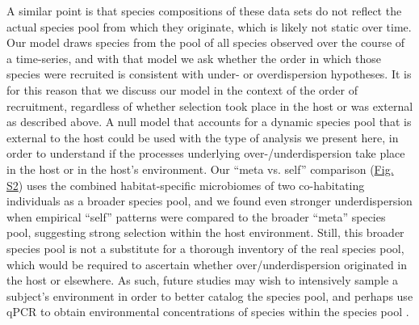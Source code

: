 \documentclass{article}
\begin{document}
\par
A similar point is that species compositions of these data sets do not reflect the actual species pool from which they originate, which is likely not static over time. Our model draws species from the pool of all species observed over the course of a time-series, and with that model we ask whether the order in which those species were recruited is consistent with under- or overdispersion hypotheses. It is for this reason that we discuss our model in the context of the order of recruitment, regardless of whether selection took place in the host or was external as described above. A null model that accounts for a dynamic species pool that is external to the host could be used with the type of analysis we present here, in order to understand if the processes underlying over-/underdispersion take place in the host or in the host’s environment. Our “meta vs. self” comparison (\hyperref[sec:figureS2]{Fig. S2}) uses the combined habitat-specific microbiomes of two co-habitating individuals as a broader species pool, and we found even stronger underdispersion when empirical “self” patterns were compared to the broader “meta” species pool, suggesting strong selection within the host environment. Still, this broader species pool is not a substitute for a thorough inventory of the real species pool, which would be required to ascertain whether over/underdispersion originated in the host or elsewhere. As such, future studies may wish to intensively sample a subject’s environment in order to better catalog the species pool, and perhaps use qPCR to obtain environmental concentrations of species within the species pool \cite{Williamson761486}.  
\par
\end{document}
